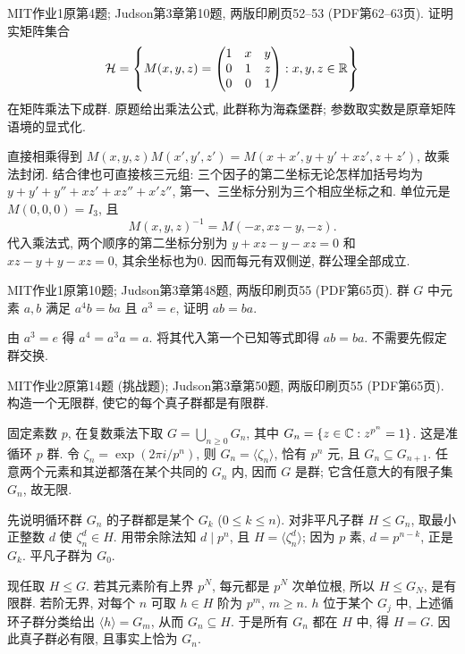 \begin{exercise}\label{ex:judson10}
MIT作业1原第4题; Judson第3章第10题, 两版印刷页52--53 (PDF第62--63页). 证明实矩阵集合
\[
\mathcal H=\left\{M(x,y,z)=\begin{pmatrix}1&x&y\\0&1&z\\0&0&1\end{pmatrix}:x,y,z\in\mathbb R\right\}
\]
在矩阵乘法下成群. 原题给出乘法公式, 此群称为海森堡群; 参数取实数是原章矩阵语境的显式化.
\end{exercise}
\begin{solution}
直接相乘得到 $M(x,y,z)M(x',y',z')=M(x+x',y+y'+xz',z+z')$, 故乘法封闭. 结合律也可直接核三元组: 三个因子的第二坐标无论怎样加括号均为 $y+y'+y''+xz'+xz''+x'z''$, 第一、三坐标分别为三个相应坐标之和. 单位元是 $M(0,0,0)=I_3$, 且
\[
M(x,y,z)^{-1}=M(-x,xz-y,-z).
\]
代入乘法式, 两个顺序的第二坐标分别为 $y+xz-y-xz=0$ 和 $xz-y+y-xz=0$, 其余坐标也为0. 因而每元有双侧逆, 群公理全部成立.
\end{solution}

\begin{exercise}\label{ex:judson48}
MIT作业1原第10题; Judson第3章第48题, 两版印刷页55 (PDF第65页). 群 $G$ 中元素 $a,b$ 满足 $a^4b=ba$ 且 $a^3=e$, 证明 $ab=ba$.
\end{exercise}
\begin{solution}
由 $a^3=e$ 得 $a^4=a^3a=a$. 将其代入第一个已知等式即得 $ab=ba$. 不需要先假定群交换.
\end{solution}

\begin{exercise}\label{ex:judson50}
MIT作业2原第14题 (挑战题); Judson第3章第50题, 两版印刷页55 (PDF第65页). 构造一个无限群, 使它的每个真子群都是有限群.
\end{exercise}
\begin{solution}
固定素数 $p$, 在复数乘法下取 $G=\bigcup_{n\ge0}G_n$, 其中 $G_n=\{z\in\mathbb C:z^{p^n}=1\}$. 这是准循环 $p$ 群. 令 $\zeta_n=\exp(2\pi i/p^n)$, 则 $G_n=\langle\zeta_n\rangle$, 恰有 $p^n$ 元, 且 $G_n\subseteq G_{n+1}$. 任意两个元素和其逆都落在某个共同的 $G_n$ 内, 因而 $G$ 是群; 它含任意大的有限子集 $G_n$, 故无限.

先说明循环群 $G_n$ 的子群都是某个 $G_k$ ($0\le k\le n$). 对非平凡子群 $H\le G_n$, 取最小正整数 $d$ 使 $\zeta_n^d\in H$. 用带余除法知 $d\mid p^n$, 且 $H=\langle\zeta_n^d\rangle$; 因为 $p$ 素, $d=p^{n-k}$, 正是 $G_k$. 平凡子群为 $G_0$.

现任取 $H\le G$. 若其元素阶有上界 $p^N$, 每元都是 $p^N$ 次单位根, 所以 $H\le G_N$, 是有限群. 若阶无界, 对每个 $n$ 可取 $h\in H$ 阶为 $p^m$, $m\ge n$. $h$ 位于某个 $G_j$ 中, 上述循环子群分类给出 $\langle h\rangle=G_m$, 从而 $G_n\subseteq H$. 于是所有 $G_n$ 都在 $H$ 中, 得 $H=G$. 因此真子群必有限, 且事实上恰为 $G_n$.
\end{solution}
